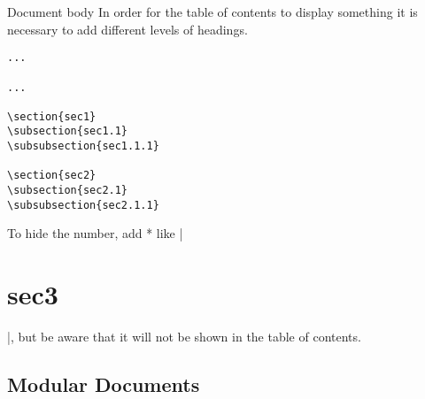 \begin{frame}[fragile]{Document body}
    In order for the table of contents to display something it is necessary to add different levels of headings.

    \begin{command}
        \begin{verbatim}
...

...

\section{sec1}
\subsection{sec1.1}
\subsubsection{sec1.1.1}

\section{sec2}
\subsection{sec2.1}
\subsubsection{sec2.1.1}

        \end{verbatim}
    \end{command}
    \pause
    To hide the number, add * like \LC|\section*{sec3}|, but be aware that it will not be shown in the table of contents.
\end{frame}

\subsection{Modular Documents}

